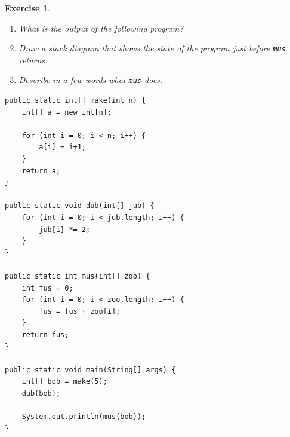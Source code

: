 \documentclass[12pt]{book}
\theoremstyle{exercise}
\newtheorem{exercise}{Exercise}[chapter]
\begin{document}
\begin{exercise}
\begin{enumerate}

\item What is the output of the following program?

\item Draw a stack diagram that shows the state of the
program just before {\tt mus} returns.

\item Describe in a few words what {\tt mus} does.
\end{enumerate}

\begin{lstlisting}
public static int[] make(int n) {
    int[] a = new int[n];

    for (int i = 0; i < n; i++) {
        a[i] = i+1;
    }
    return a;
}

public static void dub(int[] jub) {
    for (int i = 0; i < jub.length; i++) {
        jub[i] *= 2;
    }
}

public static int mus(int[] zoo) {
    int fus = 0;
    for (int i = 0; i < zoo.length; i++) {
        fus = fus + zoo[i];
    }
    return fus;
}

public static void main(String[] args) {
    int[] bob = make(5);
    dub(bob);

    System.out.println(mus(bob));
}
\end{lstlisting}
\end{exercise}
\end{document}

